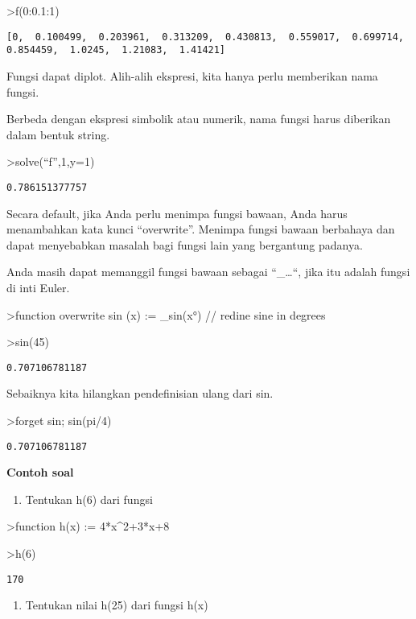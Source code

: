 \documentclass[
]{book}
\providecommand{\tightlist}{%
  \setlength{\itemsep}{0pt}\setlength{\parskip}{0pt}}
\begin{document}
\textgreater f(0:0.1:1)

\begin{verbatim}
[0,  0.100499,  0.203961,  0.313209,  0.430813,  0.559017,  0.699714,
0.854459,  1.0245,  1.21083,  1.41421]
\end{verbatim}

Fungsi dapat diplot. Alih-alih ekspresi, kita hanya perlu memberikan nama fungsi.

Berbeda dengan ekspresi simbolik atau numerik, nama fungsi harus diberikan dalam bentuk string.

\textgreater solve(``f'',1,y=1)

\begin{verbatim}
0.786151377757
\end{verbatim}

Secara default, jika Anda perlu menimpa fungsi bawaan, Anda harus menambahkan kata kunci ``overwrite''. Menimpa fungsi bawaan berbahaya dan dapat menyebabkan masalah bagi fungsi lain yang bergantung padanya.

Anda masih dapat memanggil fungsi bawaan sebagai ``\_\ldots``, jika itu adalah fungsi di inti Euler.

\textgreater function overwrite sin (x) := \_sin(x°) // redine sine in degrees

\textgreater sin(45)

\begin{verbatim}
0.707106781187
\end{verbatim}

Sebaiknya kita hilangkan pendefinisian ulang dari sin.

\textgreater forget sin; sin(pi/4)

\begin{verbatim}
0.707106781187
\end{verbatim}

\textbf{Contoh soal}

\begin{enumerate}
\def\labelenumi{\arabic{enumi}.}
\tightlist
\item
  Tentukan h(6) dari fungsi
\end{enumerate}

\textgreater function h(x) := 4*x\^{}2+3*x+8

\textgreater h(6)

\begin{verbatim}
170
\end{verbatim}

\begin{enumerate}
\def\labelenumi{\arabic{enumi}.}
\setcounter{enumi}{1}
\tightlist
\item
  Tentukan nilai h(25) dari fungsi h(x)
\end{enumerate}
\end{document}
